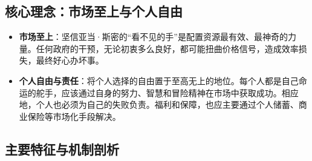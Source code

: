 \subsection{核心理念：市场至上与个人自由}

\begin{itemize}
\item \textbf{市场至上}：坚信亚当·斯密的“看不见的手”是配置资源最有效、最神奇的力量。任何政府的干预，无论初衷多么良好，都可能扭曲价格信号，造成效率损失，最终好心办坏事。
\item \textbf{个人自由与责任}：将个人选择的自由置于至高无上的地位。每个人都是自己命运的舵手，应该通过自身的努力、智慧和冒险精神在市场中获取成功。相应地，个人也必须为自己的失败负责。福利和保障，也应主要通过个人储蓄、商业保险等市场化手段解决。
\end{itemize}

\subsection{主要特征与机制剖析}

